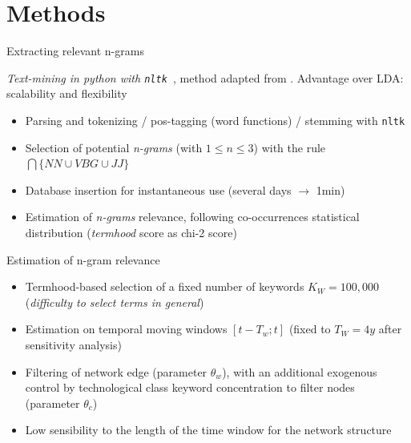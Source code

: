 \documentclass{beamer}
\begin{document}
\section{Methods}
\begin{frame}{Extracting relevant n-grams}
    
    
    \textit{Text-mining in python with \texttt{nltk}~\cite{bird2006nltk}}, method adapted from
\cite{chavalarias2013phylomemetic}. Advantage over LDA: scalability and flexibility

   

\bigskip

\begin{itemize}
\item Parsing and tokenizing / pos-tagging (word functions) / stemming  with \texttt{nltk}
\item Selection of potential \textit{n-grams} (with $1 \leq n \leq 3$) with the rule $\bigcap \{NN \cup VBG \cup JJ \}$
\item Database insertion for instantaneous use (several days $\rightarrow$ 1min)
\item Estimation of \textit{n-grams} relevance, following co-occurrences statistical distribution (\textit{termhood} score as chi-2 score)
\end{itemize}
\end{frame}

\begin{frame}{Estimation of n-gram relevance}\label{slide:relevance}
    
    \begin{itemize}
        \item Termhood-based selection of a fixed number of keywords $K_W = 100,000$ (\textit{difficulty to select terms in general}) \hyperlink{slide:filtration}{}
        \item Estimation on temporal moving windows $\left[t - T_w ; t\right]$ (fixed to $T_W = 4y$ after sensitivity analysis)
        \item Filtering of network edge (parameter $\theta_w$), with an additional exogenous control by technological class keyword concentration to filter nodes (parameter $\theta_c$)
        \item Low sensibility to the length of the time window for the network structure  
\hyperlink{slide:sensitivity}{}
    \end{itemize}
    
\end{frame}
\end{document}
